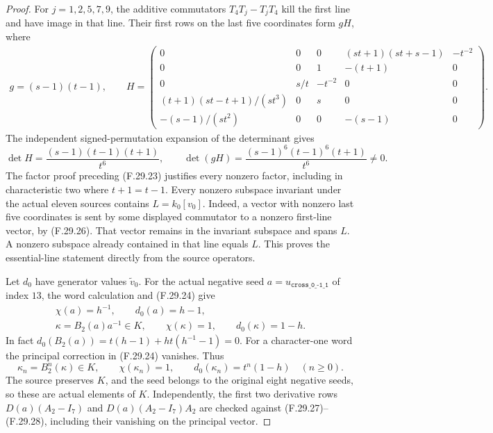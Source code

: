 \begin{proof}
For $j=1,2,5,7,9$, the additive commutators
$T_4T_j-T_jT_4$ kill the first line and have
image in that line. Their first rows on the
last five coordinates form $gH$, where
\[
 \begin{gathered}
 g=(s-1)(t-1),\qquad
 H=\begin{pmatrix}
 0&0&0&(st+1)(st+s-1)&-t^{-2}\\
 0&0&1&-(t+1)&0\\
 0&s/t&-t^{-2}&0&0\\
 (t+1)(st-t+1)/(st^3)&0&s&0&0\\
 -(s-1)/(st^2)&0&0&-(s-1)&0
 \end{pmatrix}.
 \end{gathered}                                                \tag{F.29.25}
\]
The independent signed-permutation expansion
of the determinant gives
\[
 \det H=\frac{(s-1)(t-1)(t+1)}{t^6},
 \qquad
 \det(gH)=\frac{(s-1)^6(t-1)^6(t+1)}{t^6}\ne0.
                                                               \tag{F.29.26}
\]
The factor proof preceding (F.29.23) justifies
every nonzero factor, including in characteristic
two where $t+1=t-1$.
Every nonzero subspace invariant under the
actual eleven sources contains
$L=k_0[v_0]$. Indeed, a vector with nonzero
last five coordinates is sent by some displayed
commutator to a nonzero first-line vector,
by (F.29.26). That vector remains in the
invariant subspace and spans $L$. A nonzero
subspace already contained in that line
equals $L$. This proves the essential-line
statement directly from the source operators.

Let $d_0$ have generator values $\widetilde v_0$.
For the actual negative seed
$a=u_{\texttt{cross\_0\_-1\_1}}$ of index $13$,
the word calculation and (F.29.24) give
\[
 \begin{gathered}
 \chi(a)=h^{-1},\qquad d_0(a)=h-1,\\
 \kappa=B_2(a)a^{-1}\in K,\qquad \chi(\kappa)=1,
                    \qquad d_0(\kappa)=1-h.
 \end{gathered}                                                \tag{F.29.27}
\]
In fact $d_0(B_2(a))=t(h-1)+ht(h^{-1}-1)=0$.
For a character-one word the principal
correction in (F.29.24) vanishes. Thus
\[
 \kappa_n=B_2^n(\kappa)\in K,\qquad
 \chi(\kappa_n)=1,\qquad
                       d_0(\kappa_n)=t^n(1-h)\quad(n\geq0).
                                                               \tag{F.29.28}
\]
The source preserves $K$, and the seed belongs
to the original eight negative seeds, so these
are actual elements of $K$. Independently, the
first two derivative rows
$D(a)(A_2-I_7)$ and $D(a)(A_2-I_7)A_2$ are
checked against (F.29.27)--(F.29.28), including
their vanishing on the principal vector.


\end{proof}
